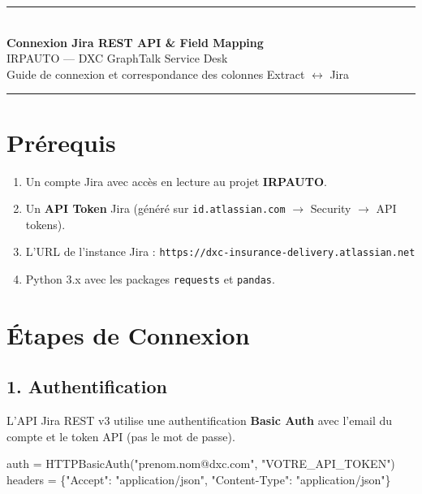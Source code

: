 \documentclass[12pt, a4paper]{article}
\begin{document}
\begin{center}
  {\color{dxcpurple}\rule{\linewidth}{1.5pt}}\\[0.4cm]
  {\LARGE\bfseries\color{dxcpurple} Connexion Jira REST API \& Field Mapping}\\[0.2cm]
  {\large IRPAUTO — DXC GraphTalk Service Desk}\\[0.15cm]
  {\normalsize\color{greytext} Guide de connexion et correspondance des colonnes Extract $\leftrightarrow$ Jira}\\[0.3cm]
  {\color{dxcpurple}\rule{\linewidth}{1.5pt}}
\end{center}

\vspace{0.6cm}

\section{Prérequis}

\begin{enumerate}[leftmargin=2em, itemsep=4pt]
  \item Un compte Jira avec accès en lecture au projet \textbf{IRPAUTO}.
  \item Un \textbf{API Token} Jira (généré sur \texttt{id.atlassian.com} $\to$ Security $\to$ API tokens).
  \item L'URL de l'instance Jira : \texttt{https://dxc-insurance-delivery.atlassian.net}
  \item Python 3.x avec les packages \texttt{requests} et \texttt{pandas}.
\end{enumerate}

\section{Étapes de Connexion}

\subsection{1. Authentification}

L'API Jira REST v3 utilise une authentification \textbf{Basic Auth} avec l'email du compte
et le token API (pas le mot de passe).

\begin{purplebox}
\small\ttfamily
auth = HTTPBasicAuth("prenom.nom@dxc.com", "VOTRE\_API\_TOKEN")\\
headers = \{"Accept": "application/json", "Content-Type": "application/json"\}
\end{purplebox}
\end{document}
